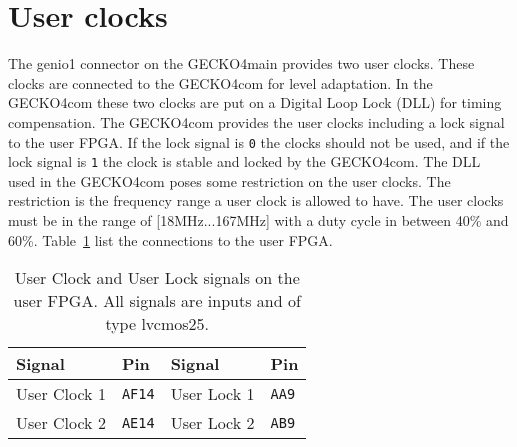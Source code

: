 \section{User clocks}
The {\sc genio1} connector on the {\sc GECKO4main} provides two user clocks.
These clocks are connected to the {\sc GECKO4com} for level adaptation. In the
{\sc GECKO4com} these two clocks are put on a Digital Loop Lock (DLL) for timing
compensation. The {\sc GECKO4com} provides the user clocks including a lock
signal to the user FPGA. If the lock signal is \verb+0+ the clocks should not be
used, and if the lock signal is \verb+1+ the clock is stable and locked by the
{\sc GECKO4com}. The DLL used in the {\sc GECKO4com} poses some restriction on
the user clocks. The restriction is the frequency range a user clock is allowed
to have. The user clocks must be in the range of [18MHz...167MHz] with a duty
cycle in between 40\% and 60\%. Table~\ref{tab:clocks} list the connections to the user
FPGA.
\begin{table}[h]
\centering%
\begin{tabular}{|l|l||l|l|}
\hline
\textbf{Signal}&\textbf{Pin}&
\textbf{Signal}&\textbf{Pin}\\
\hline
\hline
User Clock 1&\verb+AF14+&User Lock 1&\verb+AA9+\\
\hline
User Clock 2&\verb+AE14+&User Lock 2&\verb+AB9+\\
\hline
\end{tabular}
\caption{User Clock and User Lock signals on the user FPGA. All signals are {\sc
inputs} and of type {\sc lvcmos25}.}
\label{tab:clocks}
\end{table}
